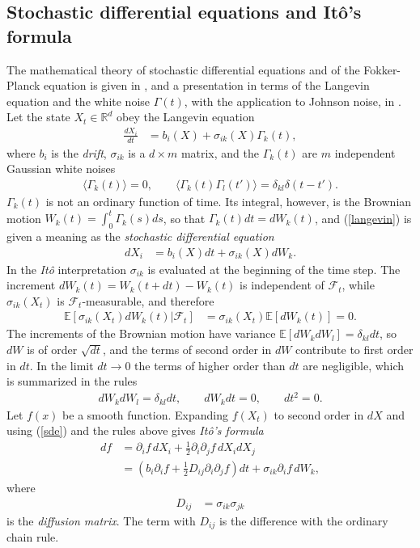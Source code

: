 \documentclass[11pt]{article}
\begin{document}
\subsection{Stochastic differential equations and It\^o's formula}
The mathematical theory of stochastic differential equations and of the Fokker-Planck equation is given in \cite{pavliotis}, and a presentation in terms of the Langevin equation and the white noise $\Gamma(t)$, with the application to Johnson noise, in \cite{gillespie}. Let the state $X_t\in\mathbb{R}^d$ obey the Langevin equation
\begin{align}
  \frac{dX_i}{dt}&=b_i(X)+\sigma_{ik}(X)\Gamma_k(t),
  \label{langevin}
\end{align}
where $b_i$ is the {\it drift}, $\sigma_{ik}$ is a $d\times m$ matrix, and the $\Gamma_k(t)$ are $m$ independent Gaussian white noises
\begin{align}
  \langle\Gamma_k(t)\rangle=0,\qquad\langle\Gamma_k(t)\Gamma_l(t')\rangle=\delta_{kl}\delta(t-t').
\end{align}
$\Gamma_k(t)$ is not an ordinary function of time. Its integral, however, is the Brownian motion $W_k(t)=\int_0^t\Gamma_k(s)ds$, so that $\Gamma_k(t)dt=dW_k(t)$, and (\ref{langevin}) is given a meaning as the {\it stochastic differential equation}
\begin{align}
  dX_i&=b_i(X)dt+\sigma_{ik}(X)dW_k.
  \label{sde}
\end{align}
In the {\it It\^o} interpretation $\sigma_{ik}$ is evaluated at the beginning of the time step. The increment $dW_k(t)=W_k(t+dt)-W_k(t)$ is independent of $\mathcal{F}_t$, while $\sigma_{ik}(X_t)$ is $\mathcal{F}_t$-measurable, and therefore
\begin{align}
  \mathbb{E}[\sigma_{ik}(X_t)dW_k(t)|\mathcal{F}_t]&=\sigma_{ik}(X_t)\mathbb{E}[dW_k(t)]=0.
  \label{itomean}
\end{align}
The increments of the Brownian motion have variance $\mathbb{E}[dW_kdW_l]=\delta_{kl}dt$, so $dW$ is of order $\sqrt{dt}$, and the terms of second order in $dW$ contribute to first order in $dt$. In the limit $dt\rightarrow 0$ the terms of higher order than $dt$ are negligible, which is summarized in the rules
\begin{align}
  dW_kdW_l=\delta_{kl}dt,\qquad dW_kdt=0,\qquad dt^2=0.
  \label{itorules}
\end{align}
Let $f(x)$ be a smooth function. Expanding $f(X_t)$ to second order in $dX$ and using (\ref{sde}) and the rules above gives {\it It\^o's formula}
\begin{align}
  df&=\partial_if\,dX_i+\frac{1}{2}\partial_i\partial_jf\,dX_idX_j\nonumber\\
  &=\left(b_i\partial_if+\frac{1}{2}D_{ij}\partial_i\partial_jf\right)dt+\sigma_{ik}\partial_if\,dW_k,
  \label{ito}
\end{align}
where
\begin{align}
  D_{ij}&=\sigma_{ik}\sigma_{jk}
\end{align}
is the {\it diffusion matrix}. The term with $D_{ij}$ is the difference with the ordinary chain rule.
\end{document}
